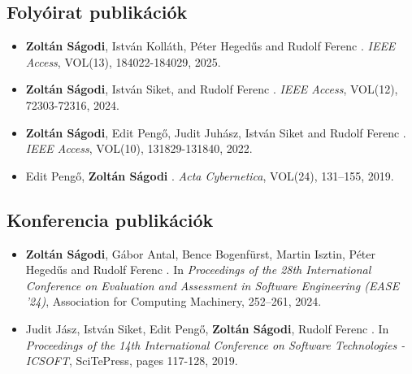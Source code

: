 \documentclass[12pt,a4paper]{extarticle}
\begin{document}
\vspace*{2em}

\subsection*{Folyóirat publikációk}

\vspace*{1em}

\begin{itemize}[wide = 0pt, widest = {[4]}, leftmargin =*]
	
	
	\item  \textbf{Zoltán Ságodi}, István Kolláth, Péter Heged\H{u}s and Rudolf Ferenc
	.
	\newblock \emph{IEEE Access}, VOL(13), 184022-184029, 2025.
	
	\item  \textbf{Zoltán Ságodi}, István Siket, and Rudolf Ferenc
	.
	\newblock \emph{IEEE Access}, VOL(12), 72303-72316, 2024.
	
	\item  \textbf{Zoltán Ságodi}, Edit Pengő, Judit Juhász, István Siket and Rudolf Ferenc
	.
	\newblock \emph{IEEE Access}, VOL(10), 131829-131840, 2022.
	
	\item  Edit Pengő, \textbf{Zoltán Ságodi}
	.
	\newblock \emph{Acta Cybernetica}, VOL(24), 131–155, 2019.
	
\end{itemize}

\subsection*{Konferencia publikációk}
\vspace*{1em}

\begin{itemize}[wide = 0pt, widest = {[4]}, leftmargin =*]
	
	\item  \textbf{Zoltán Ságodi}, Gábor Antal, Bence Bogenfürst, Martin Isztin, Péter Heged\H{u}s and Rudolf Ferenc
	.
	\newblock In \emph{Proceedings of the 28th International Conference on Evaluation and Assessment in Software Engineering (EASE '24)}, Association for Computing Machinery, 252–261, 2024.
	
	\item  Judit Jász, István Siket, Edit Pengő, \textbf{Zoltán Ságodi}, Rudolf Ferenc
	.
	\newblock In \emph{Proceedings of the 14th International Conference on Software Technologies - ICSOFT}, SciTePress, pages 117-128, 2019.
	
\end{itemize}
\end{document}
